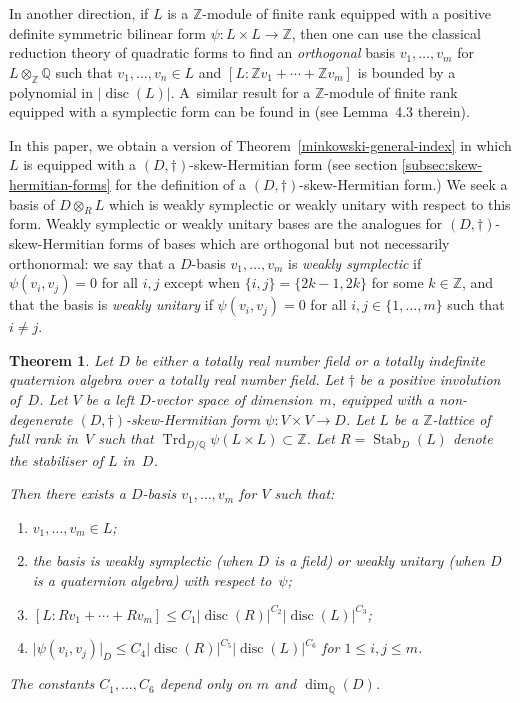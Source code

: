 \documentclass[11pt]{article}
\numberwithin{equation}{section}
\newenvironment{enumeratei}
{\bgroup\def\theenumi{\roman{enumi}}\def\theenumii{\alph{enumii}}\begin{enumerate}}
{\end{enumerate}\egroup}
\newcommand{\bQ}{\mathbb{Q}}
\newcommand{\bZ}{\mathbb{Z}}
\DeclareMathOperator{\disc}{disc}
\DeclareMathOperator{\Stab}{Stab}
\DeclareMathOperator{\Trd}{Trd}
\newcommand{\abs}[1]{\lvert #1 \rvert}
\newcommand{\defterm}[1]{\emph{#1}}
\newtheorem{theorem}[lemma]{Theorem}
\begin{document}
In another direction, if $L$ is a $\bZ$-module of finite rank equipped with a positive definite symmetric bilinear form $\psi \colon L \times L \to \bZ$, then one can use the classical reduction theory of quadratic forms to find an \textit{orthogonal} basis $v_1, \dotsc, v_m$ for $L \otimes_\bZ \bQ$ such that $v_1, \dotsc, v_n \in L$ and $[L:\bZ v_1 + \dotsb + \bZ v_m]$ is bounded by a polynomial in $\abs{\disc(L)}$.
A~similar result for a $\bZ$-module of finite rank equipped with a symplectic form can be found in \cite{Orr15} (see Lemma~4.3 therein).

In this paper, we obtain a version of Theorem~\ref{minkowski-general-index} in which $L$ is equipped with a $(D,\dag)$-skew-Hermitian form (see section \ref{subsec:skew-hermitian-forms} for the definition of a $(D,\dag)$-skew-Hermitian form.)
We seek a basis of $D \otimes_R L$ which is weakly symplectic or weakly unitary with respect to this form. Weakly symplectic or weakly unitary bases are the analogues for $(D,\dag)$-skew-Hermitian forms of bases which are orthogonal but not necessarily orthonormal: we say that a $D$-basis $v_1, \dotsc, v_m$ is \defterm{weakly symplectic} if $\psi(v_i, v_j) = 0$ for all $i, j$ except when $\{i,j\} = \{2k-1,2k\}$ for some $k \in \bZ$, and that the basis is \defterm{weakly unitary} if $\psi(v_i, v_j) = 0$ for all $i, j \in \{ 1, \dotsc, m \}$ such that $i \neq j$.

\begin{theorem} \label{minkowski-hermitian-perfect}
Let $D$ be either a totally real number field or a totally indefinite quaternion algebra over a totally real number field.
Let $\dag$ be a positive involution of~$D$.
Let $V$ be a left $D$-vector space of dimension~$m$, equipped with a non-degenerate $(D,\dag)$-skew-Hermitian form $\psi \colon V \times V \to D$.
Let $L$ be a $\bZ$-lattice of full rank in~$V$ such that $\Trd_{D/\bQ} \psi(L \times L) \subset \bZ$.
Let $R=\Stab_D(L)$ denote the stabiliser of $L$ in~$D$.

Then there exists a $D$-basis $v_1, \dotsc, v_m$ for $V$ such that:
\begin{enumeratei}
\item\label{minkowski-hermitian-perfecti} $v_1, \dotsc, v_m \in L$;
\item\label{minkowski-hermitian-perfectii} the basis is weakly symplectic (when $D$ is a field) or weakly unitary (when $D$ is a quaternion algebra) with respect to~$\psi$;
\item\label{minkowski-hermitian-perfectiii} $[L:Rv_1 + \dotsb + Rv_m] \leq C_{1} \abs{\disc(R)}^{C_{2}} \abs{\disc(L)}^{C_{3}}$;
\item\label{minkowski-hermitian-perfectiv} $\abs{\psi(v_i, v_j)}_D \leq C_{4} \abs{\disc(R)}^{C_{5}} \abs{\disc(L)}^{C_{6}}$ for $1 \leq i, j \leq m$.
\end{enumeratei}
The constants $C_{1}, \dotsc, C_{6}$ depend only on $m$ and $\dim_\bQ(D)$.
\end{theorem}
\end{document}
